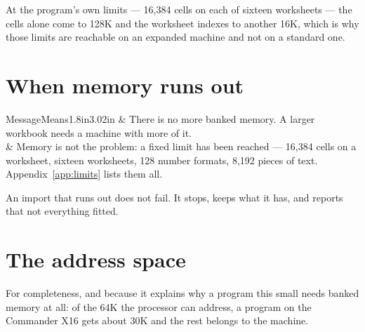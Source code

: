 At the program's own limits --- 16,384 cells on each of sixteen worksheets ---
the cells alone come to 128K and the worksheet indexes to another 16K, which is
why those limits are reachable on an expanded machine and not on a standard one.

\section{When memory runs out}

\begin{cctable}{Message}{Means}{1.8in}{3.02in}
 & There is no more banked memory. A larger workbook needs a
machine with more of it. \\
 & Memory is not the problem: a fixed limit has been
reached --- 16,384 cells on a worksheet, sixteen worksheets, 128 number formats,
8,192 pieces of text. Appendix~\ref{app:limits} lists them all. \\
\end{cctable}

An import that runs out does not fail. It stops, keeps what it has, and reports
that not everything fitted.

\section{The address space}

For completeness, and because it explains why a program this small needs banked
memory at all: of the 64K the processor can address, a program on the Commander
X16 gets about 30K and the rest belongs to the machine.

